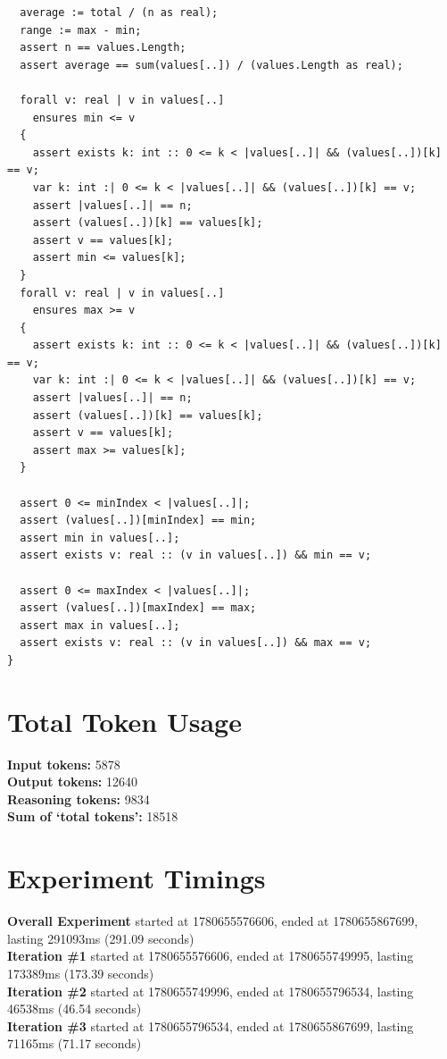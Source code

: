 \documentclass{article}
\begin{document}
\begin{lstlisting}
  average := total / (n as real);
  range := max - min;
  assert n == values.Length;
  assert average == sum(values[..]) / (values.Length as real);

  forall v: real | v in values[..]
    ensures min <= v
  {
    assert exists k: int :: 0 <= k < |values[..]| && (values[..])[k] == v;
    var k: int :| 0 <= k < |values[..]| && (values[..])[k] == v;
    assert |values[..]| == n;
    assert (values[..])[k] == values[k];
    assert v == values[k];
    assert min <= values[k];
  }
  forall v: real | v in values[..]
    ensures max >= v
  {
    assert exists k: int :: 0 <= k < |values[..]| && (values[..])[k] == v;
    var k: int :| 0 <= k < |values[..]| && (values[..])[k] == v;
    assert |values[..]| == n;
    assert (values[..])[k] == values[k];
    assert v == values[k];
    assert max >= values[k];
  }

  assert 0 <= minIndex < |values[..]|;
  assert (values[..])[minIndex] == min;
  assert min in values[..];
  assert exists v: real :: (v in values[..]) && min == v;

  assert 0 <= maxIndex < |values[..]|;
  assert (values[..])[maxIndex] == max;
  assert max in values[..];
  assert exists v: real :: (v in values[..]) && max == v;
}
\end{lstlisting}
\section*{Total Token Usage}
\textbf{Input tokens: }5878
\\\textbf{Output tokens: }12640
\\\textbf{Reasoning tokens: }9834
\\\textbf{Sum of `total tokens': }18518
\section*{Experiment Timings}
\textbf{Overall Experiment} started at 1780655576606, ended at 1780655867699, lasting 291093ms (291.09 seconds)
\\\textbf{Iteration \#1} started at 1780655576606, ended at 1780655749995, lasting 173389ms (173.39 seconds)
\\\textbf{Iteration \#2} started at 1780655749996, ended at 1780655796534, lasting 46538ms (46.54 seconds)
\\\textbf{Iteration \#3} started at 1780655796534, ended at 1780655867699, lasting 71165ms (71.17 seconds)
\end{document}
